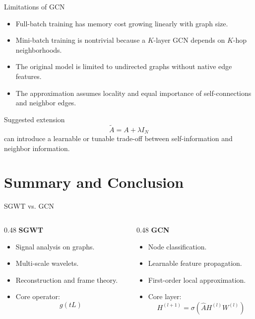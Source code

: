 \documentclass[aspectratio=1610,xcolor=dvipsnames,t]{beamer}
\begin{document}
\begin{frame}{Limitations of GCN}
\begin{itemize}
  \item Full-batch training has memory cost growing linearly with graph size.
  \item Mini-batch training is nontrivial because a $K$-layer GCN depends on $K$-hop neighborhoods.
  \item The original model is limited to undirected graphs without native edge features.
  \item The approximation assumes locality and equal importance of self-connections and neighbor edges.
\end{itemize}

\begin{block}{Suggested extension}
\[
\widetilde A=A+\lambda I_N
\tag{GCN Eq. 11}
\]
can introduce a learnable or tunable trade-off between self-information and neighbor information.
\end{block}
\end{frame}

\section[End]{Summary and Conclusion}

\begin{frame}{SGWT vs. GCN}
\begin{columns}[T]
\begin{column}{0.48\textwidth}
\textbf{SGWT}
\begin{itemize}
  \item Signal analysis on graphs.
  \item Multi-scale wavelets.
  \item Reconstruction and frame theory.
  \item Core operator:
  \[
  g(tL)
  \]
\end{itemize}
\end{column}

\begin{column}{0.48\textwidth}
\textbf{GCN}
\begin{itemize}
  \item Node classification.
  \item Learnable feature propagation.
  \item First-order local approximation.
  \item Core layer:
  \[
  H^{(l+1)}=\sigma(\widehat A H^{(l)}W^{(l)})
  \]
\end{itemize}
\end{column}
\end{columns}
\end{frame}
\end{document}
